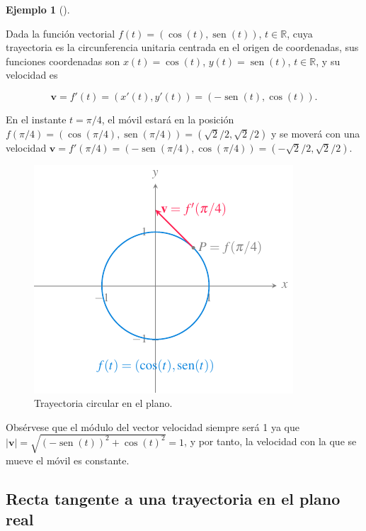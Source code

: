 \documentclass[
  a4paper,
]{scrreport}
\theoremstyle{definition}
\newtheorem{example}{Ejemplo}[chapter]
\theoremstyle{plain}
\theoremstyle{plain}
\theoremstyle{plain}
\theoremstyle{definition}
\theoremstyle{remark}
\begin{document}
\begin{example}[]\protect\hypertarget{exm-movimiento-curvilineo-plano}{}\label{exm-movimiento-curvilineo-plano}

Dada la función vectorial \(f(t) = (\cos(t),\operatorname{sen}(t))\),
\(t\in \mathbb{R}\), cuya trayectoria es la circunferencia unitaria
centrada en el origen de coordenadas, sus funciones coordenadas son
\(x(t) = \cos(t)\), \(y(t) = \operatorname{sen}(t)\),
\(t\in \mathbb{R}\), y su velocidad es

\[
\mathbf{v} = f'(t) = (x'(t),y'(t)) = (-\operatorname{sen}(t), \cos(t)).
\]

En el instante \(t=\pi/4\), el móvil estará en la posición
\(f(\pi/4) = (\cos(\pi/4),\operatorname{sen}(\pi/4)) =(\sqrt{2}/2,\sqrt{2}/2)\)
y se moverá con una velocidad
\(\mathbf{v}=f'(\pi/4)=(-\operatorname{sen}(\pi/4),\cos(\pi/4))=(-\sqrt{2}/2,\sqrt{2}/2)\).

\begin{figure}

{\centering \includegraphics{img/derivadas-funciones-vectoriales/trayectoria-circular.pdf}

}

\caption{Trayectoria circular en el plano.}

\end{figure}

Obsérvese que el módulo del vector velocidad siempre será 1 ya que
\(|\mathbf{v}|=\sqrt{(-\operatorname{sen}(t))^2+\cos(t)^2}=1\), y por
tanto, la velocidad con la que se mueve el móvil es constante.

\end{example}

\hypertarget{recta-tangente-a-una-trayectoria-en-el-plano-real}{%
\subsection{Recta tangente a una trayectoria en el plano
real}\label{recta-tangente-a-una-trayectoria-en-el-plano-real}}
\end{document}
